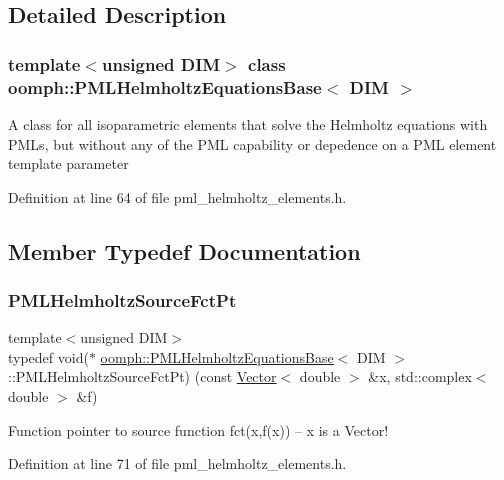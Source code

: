 \subsection{Detailed Description}
\subsubsection*{template$<$unsigned D\+IM$>$\newline
class oomph\+::\+P\+M\+L\+Helmholtz\+Equations\+Base$<$ D\+I\+M $>$}

A class for all isoparametric elements that solve the Helmholtz equations with P\+M\+Ls, but without any of the P\+ML capability or depedence on a P\+ML element template parameter 

Definition at line 64 of file pml\+\_\+helmholtz\+\_\+elements.\+h.



\subsection{Member Typedef Documentation}
\mbox{\label{classoomph_1_1PMLHelmholtzEquationsBase_abf57477abc2672cd680742e17721a07f}} 
\subsubsection{\texorpdfstring{P\+M\+L\+Helmholtz\+Source\+Fct\+Pt}{PMLHelmholtzSourceFctPt}}
{\footnotesize\ttfamily template$<$unsigned D\+IM$>$ \\
typedef void($\ast$ \hyperlink{classoomph_1_1PMLHelmholtzEquationsBase}{oomph\+::\+P\+M\+L\+Helmholtz\+Equations\+Base}$<$ D\+IM $>$\+::P\+M\+L\+Helmholtz\+Source\+Fct\+Pt) (const \hyperlink{classoomph_1_1Vector}{Vector}$<$ double $>$ \&x, std\+::complex$<$ double $>$ \&f)}



Function pointer to source function fct(x,f(x)) -- x is a Vector! 



Definition at line 71 of file pml\+\_\+helmholtz\+\_\+elements.\+h.



